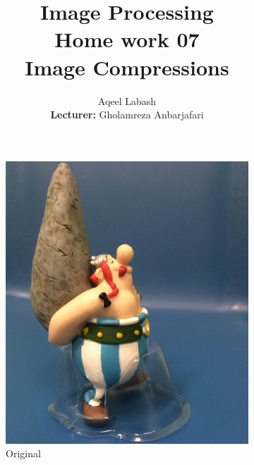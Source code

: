 \documentclass{article}
\title{Image Processing\\
	Home work 07\\Image Compressions}
\author{Aqeel Labash\\ \textbf{Lecturer:} Gholamreza Anbarjafari}
\begin{document}
	\maketitle
\begin{figure}[H]
\begin{subfigure}{.5\textwidth}
  \centering
\includegraphics[scale=0.13]{Obelix.jpg}
  \caption{Original}
  \label{fig:sfig1}
\end{subfigure}
\begin{subfigure}{.5\textwidth}
  \centering

\end{subfigure}
\end{figure}
\end{document}
